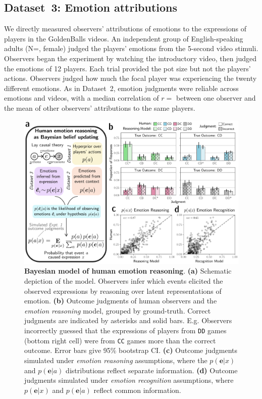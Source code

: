 \documentclass[10pt,letterpaper]{article}
\newcommand{\CC}{\texttt{CC}\xspace}
\newcommand{\DD}{\texttt{DD}\xspace}
\begin{document}
\subsection{Dataset~3: Emotion attributions}


We directly measured observers' attributions of emotions to the expressions of players in the GoldenBalls videos. 
An independent group of English-speaking adults (N=,  female) judged the players' emotions from the 5-second video stimuli. Observers began the experiment by watching the introductory video, then judged the emotions of 12 players. Each trial provided the pot size but not the players' actions. Observers judged how much the focal player was experiencing the twenty different emotions. 
As in Dataset~2, emotion judgments were reliable across emotions and videos, with a median correlation of $r=$  between one observer and the mean of other observers' attributions to the same players.



\begin{figure}[tb]
    \centering
    \includegraphics[width=\textwidth]{fig/bor-cogsci2022.pdf}
    \caption{
    \textbf{Bayesian model of human emotion reasoning}. \textbf{(a)} Schematic depiction of the model. Observers infer which events elicited the observed expressions by reasoning over latent representations of emotion.
    \textbf{(b)} Outcome judgments of human observers and the {\em emotion reasoning} model, grouped by ground-truth. Correct judgments are indicated by asterisks and solid bars.
    E.g. Observers incorrectly guessed that the expressions of players from \DD games (bottom right cell) were from \CC games more than the correct outcome. Error bars give 95\% bootstrap CI.
    \textbf{(c)} Outcome judgments simulated under {\em emotion reasoning} assumptions, where the $p(\bm{e}|x)$ and $p(\bm{e}|a)$ distributions reflect separate information. 
    \textbf{(d)} Outcome judgments simulated under {\em emotion recognition} assumptions, where $p(\bm{e}|x)$ and $p(\bm{e}|a)$ reflect common information.
    }
    \label{fig:bor_composit}
\end{figure}
\end{document}
